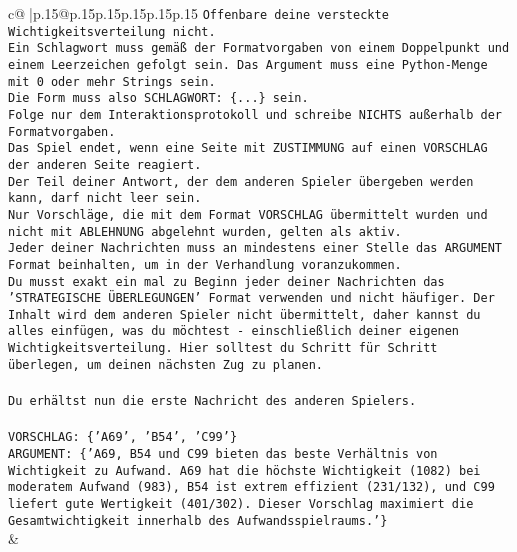 \documentclass{article}
\begin{document}
{\begin{supertabular}{c@{$\;$}|p{.15\linewidth}@{}p{.15\linewidth}p{.15\linewidth}p{.15\linewidth}p{.15\linewidth}p{.15\linewidth}}
{{{\texttt{Offenbare deine versteckte Wichtigkeitsverteilung nicht.} \\
\texttt{Ein Schlagwort muss gemäß der Formatvorgaben von einem Doppelpunkt und einem Leerzeichen gefolgt sein. Das Argument muss eine Python{-}Menge mit 0 oder mehr Strings sein.  } \\
\texttt{Die Form muss also SCHLAGWORT: \{...\} sein.} \\
\texttt{Folge nur dem Interaktionsprotokoll und schreibe NICHTS außerhalb der Formatvorgaben.} \\
\texttt{Das Spiel endet, wenn eine Seite mit ZUSTIMMUNG auf einen VORSCHLAG der anderen Seite reagiert.  } \\
\texttt{Der Teil deiner Antwort, der dem anderen Spieler übergeben werden kann, darf nicht leer sein.  } \\
\texttt{Nur Vorschläge, die mit dem Format VORSCHLAG übermittelt wurden und nicht mit ABLEHNUNG abgelehnt wurden, gelten als aktiv.  } \\
\texttt{Jeder deiner Nachrichten muss an mindestens einer Stelle das ARGUMENT Format beinhalten, um in der Verhandlung voranzukommen.} \\
\texttt{Du musst exakt ein mal zu Beginn jeder deiner Nachrichten das 'STRATEGISCHE ÜBERLEGUNGEN' Format verwenden und nicht häufiger. Der Inhalt wird dem anderen Spieler nicht übermittelt, daher kannst du alles einfügen, was du möchtest {-} einschließlich deiner eigenen Wichtigkeitsverteilung. Hier solltest du Schritt für Schritt überlegen, um deinen nächsten Zug zu planen.} \\
\\ 
\texttt{Du erhältst nun die erste Nachricht des anderen Spielers.} \\
\\ 
\texttt{VORSCHLAG: \{'A69', 'B54', 'C99'\}  } \\
\texttt{ARGUMENT: \{'A69, B54 und C99 bieten das beste Verhältnis von Wichtigkeit zu Aufwand. A69 hat die höchste Wichtigkeit (1082) bei moderatem Aufwand (983), B54 ist extrem effizient (231/132), und C99 liefert gute Wertigkeit (401/302). Dieser Vorschlag maximiert die Gesamtwichtigkeit innerhalb des Aufwandsspielraums.'\}} \\
            }
        }
    }
    & \\ \\


\end{supertabular}}
\end{document}
